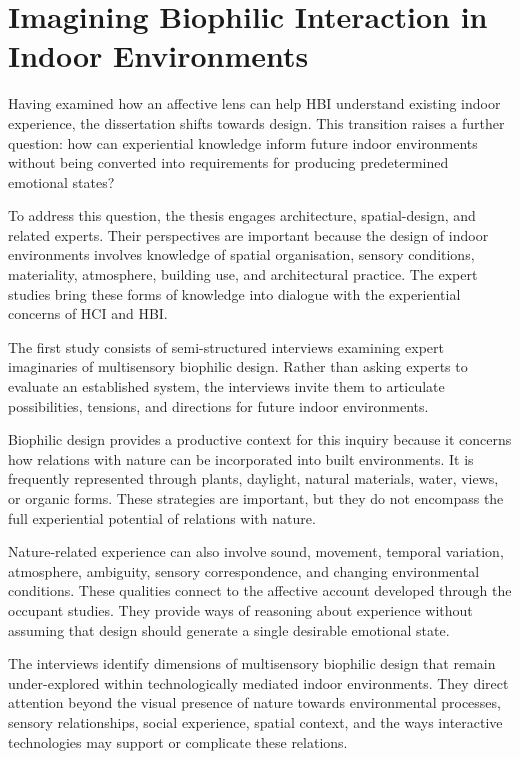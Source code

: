 \section{Imagining Biophilic Interaction in Indoor Environments}

Having examined how an affective lens can help HBI understand existing indoor experience, the dissertation shifts towards design. This transition raises a further question: how can experiential knowledge inform future indoor environments without being converted into requirements for producing predetermined emotional states?

To address this question, the thesis engages architecture, spatial-design, and related experts. Their perspectives are important because the design of indoor environments involves knowledge of spatial organisation, sensory conditions, materiality, atmosphere, building use, and architectural practice. The expert studies bring these forms of knowledge into dialogue with the experiential concerns of HCI and HBI.

The first study consists of semi-structured interviews examining expert imaginaries of multisensory biophilic design. Rather than asking experts to evaluate an established system, the interviews invite them to articulate possibilities, tensions, and directions for future indoor environments.

Biophilic design provides a productive context for this inquiry because it concerns how relations with nature can be incorporated into built environments. It is frequently represented through plants, daylight, natural materials, water, views, or organic forms. These strategies are important, but they do not encompass the full experiential potential of relations with nature.

Nature-related experience can also involve sound, movement, temporal variation, atmosphere, ambiguity, sensory correspondence, and changing environmental conditions. These qualities connect to the affective account developed through the occupant studies. They provide ways of reasoning about experience without assuming that design should generate a single desirable emotional state.

The interviews identify dimensions of multisensory biophilic design that remain under-explored within technologically mediated indoor environments. They direct attention beyond the visual presence of nature towards environmental processes, sensory relationships, social experience, spatial context, and the ways interactive technologies may support or complicate these relations.

